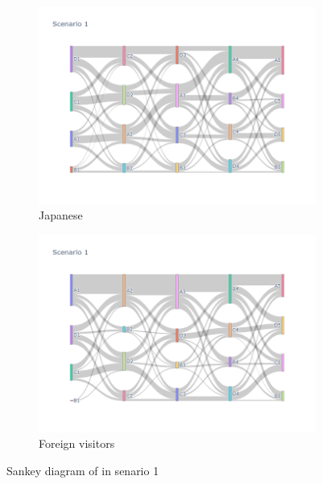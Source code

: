 \begin{figure}[h]
  \begin{subfigure}{0.5\textwidth}
    \centering
    \includegraphics[width=\textwidth]{Figure/Figure26a.jpg}
    \caption{Japanese}
  \end{subfigure}
  \begin{subfigure}{0.5\textwidth}
    \centering
    \includegraphics[width=\linewidth]{Figure/Figure27a.jpg}
    \caption{Foreign visitors}
  \end{subfigure}
  \caption{Sankey diagram of in senario 1 }
  \label{fig26a}
\end{figure}

